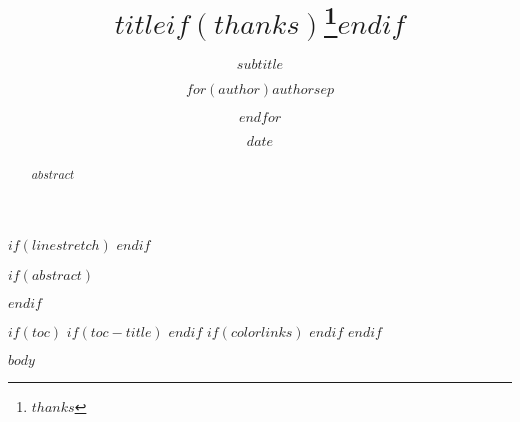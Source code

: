 \documentclass[
  $if(fontsize)$
  $fontsize$,
  $endif$
  $if(papersize)$
  $papersize$paper,
  $endif$]{$documentclass$}
\title{$title$$if(thanks)$\thanks{$thanks$}$endif$}
\subtitle{$subtitle$}
\author{$for(author)$$author$$sep$ \and $endfor$}
\date{$date$}
\begin{document}
\emergencystretch=10pt

$if(linestretch)$
$endif$

\maketitle
\thispagestyle{empty}

$if(abstract)$
\begin{abstract}
$abstract$
\end{abstract}
$endif$

$if(toc)$
$if(toc-title)$
\renewcommand*\contentsname{$toc-title$}
$endif$
{
$if(colorlinks)$
\hypersetup{linkcolor=$if(toccolor)$$toccolor$$else$$endif$}
$endif$
\setcounter{tocdepth}{$toc-depth$}
\tableofcontents
}
$endif$

\clearpage
{}

$body$
\end{document}

